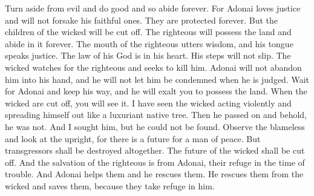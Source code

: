 \begin{biblechapter}
\verse Turn aside from evil and do good 
and so abide forever.
\verse For Adonai loves justice 
and will not forsake his faithful ones. 
They are protected forever. 
But the children of the wicked will be cut off.
\verse The righteous will possess the land 
and abide in it forever.
\verse The mouth of the righteous utters wisdom, 
and his tongue speaks justice.
\verse The law of his God is in his heart. 
His steps will not slip.
\verse The wicked watches for the righteous 
and seeks to kill him.
\verse Adonai will not abandon him into his hand, 
and he will not let him be condemned when he is judged.
\verse Wait for Adonai and keep his way, 
and he will exalt you to possess the land. 
When the wicked are cut off, you will see it.
\verse I have seen the wicked acting violently 
and spreading himself out 
like a luxuriant native tree.
\verse Then he passed on and behold, he was not. 
And I sought him, but he could not be found.
\verse Observe the blameless and look at the upright, 
for there is a future for a man of peace.
\verse But transgressors shall be destroyed altogether. 
The future of the wicked shall be cut off.
\verse And the salvation of the righteous is from Adonai, 
their refuge in the time of trouble.
\verse And Adonai helps them and he rescues them. 
He rescues them from the wicked and saves them, 
because they take refuge in him.
\end{biblechapter}


